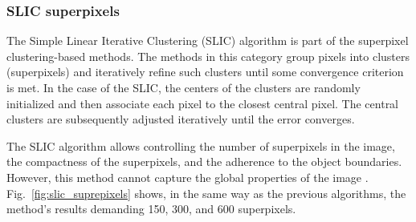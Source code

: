 \subsubsection{SLIC superpixels}
The Simple Linear Iterative Clustering (SLIC) algorithm is part of the superpixel clustering-based methods. The methods in this category group pixels into clusters (superpixels) and iteratively refine such clusters until some convergence criterion is met. In the case of the SLIC, the centers of the clusters are randomly initialized and then associate each pixel to the closest central pixel. The central clusters are subsequently adjusted iteratively until the error converges.

The SLIC algorithm allows controlling the number of superpixels in the image, the compactness of the superpixels, and the adherence to the object boundaries. However, this method cannot capture the global properties of the image \citep{Stutz.Hermans.ea:CVIU:2018}. Fig.\ \ref{fig:slic_suprepixels} shows, in the same way as the previous algorithms, the method's results demanding 150, 300, and 600 superpixels.


